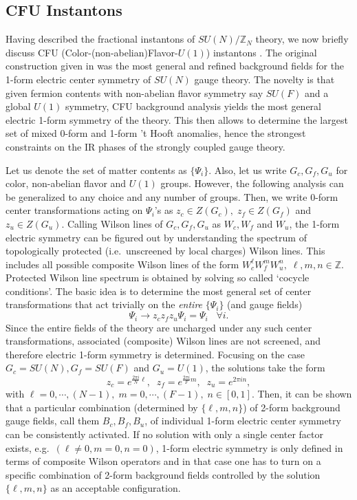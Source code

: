 \documentclass[11pt,a4paper]{article}
\def\beq{\begin{equation}}
\def\eeq{\end{equation}}
\begin{document}
\subsection{CFU Instantons}
\label{app:CFU}

Having described the fractional instantons of $SU(N)/\mathbb{Z}_N$ theory, we now briefly discuss CFU (Color-(non-abelian)Flavor-$U(1)$) instantons \cite{Anber:2021iip}. The original construction given in \cite{Anber:2021iip} was the most general and refined background fields for the 1-form electric center symmetry of $SU(N)$ gauge theory. The novelty is that given fermion contents with non-abelian flavor symmetry say $SU(F)$ and a global $U(1)$ symmetry, CFU background analysis yields the most general electric 1-form symmetry of the theory. This then allows to determine the largest set of mixed 0-form and 1-form 't Hooft anomalies, hence the strongest constraints on the IR phases of the strongly coupled gauge theory.   

Let us denote the set of matter contents as $\lbrace \Psi_i \rbrace$. Also, let us write $G_c, G_f, G_u$ for color, non-abelian flavor and $U(1)$ groups. However, the following analysis can be generalized to any choice and any number of groups. Then, we write 0-form center transformations acting on $\Psi_i$'s as $z_c \in Z (G_c), \; z_f \in Z (G_f)$ and $z_u \in Z (G_u)$. Calling Wilson lines of $G_c, G_f, G_u$ as $W_c, W_f$ and $W_u$, the 1-form electric symmetry can be figured out by understanding the spectrum of topologically protected (i.e.~unscreened by local charges) Wilson lines. This includes all possible composite Wilson lines of the form $W_c^\ell W_f^m W_u^n, \; \ell, m , n \in \mathbb{Z}$. Protected Wilson line spectrum is obtained by solving so called `cocycle conditions'. The basic idea is to determine the most general set of center transformations that act trivially on the \emph{entire} $\lbrace \Psi_i \rbrace$ (and gauge fields)
%
\beq 
\Psi_i \to z_c z_f z_u \Psi_i = \Psi_i \;\;\; \forall i .
\eeq 
%
Since the entire fields of the theory are uncharged under any such center transformations, associated (composite) Wilson lines are not screened, and therefore electric 1-form symmetry is determined. Focusing on the case $G_c = SU(N), G_f = SU(F)$ and $G_u = U(1)$, the solutions take the form 
%
\beq
z_c = e^{\frac{2\pi i}{N} \ell}, \;\; z_f = e^{\frac{2\pi i }{F} m}, \;\; z_u = e^{2\pi i n},
\eeq
%
with $\ell = 0, \cdots, (N-1), \; m = 0, \cdots, (F-1), \; n \in [0,1]$. Then, it can be shown that a particular combination (determined by $\{ \ell, m, n \}$) of 2-form background gauge fields, call them $B_c, B_f, B_u$, of individual 1-form electric center symmetry can be consistently activated. If no solution with only a single center factor exists, e.g.~$(\ell\neq 0 , m=0, n=0)$, 1-form electric symmetry is only defined in terms of composite Wilson operators and in that case one has to turn on a specific combination of 2-form background fields controlled by the solution $\{ \ell, m, n \}$ as an acceptable configuration. 
\end{document}
